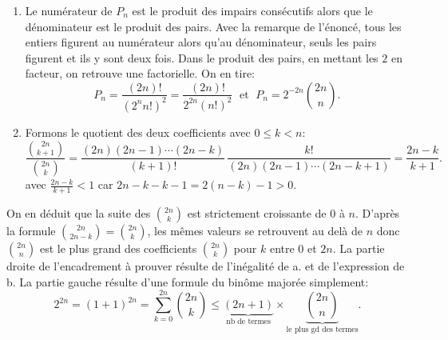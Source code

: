 \begin{enumerate}
\begin{enumerate}
  \item Le numérateur de $P_n$ est le produit des impairs consécutifs alors que le dénominateur est le produit des pairs. Avec la remarque de l'énoncé, tous les entiers figurent au numérateur alors qu'au dénominateur, seuls les pairs figurent et ils y sont deux fois. Dans le produit des pairs, en mettant les $2$ en facteur, on retrouve une factorielle. On en tire:
\begin{displaymath}
  P_n = \frac{(2n)!}{(2^n n!)^2} = \frac{(2n)!}{2^{2n}(n!)^2} \;\text{ et }\;
  P_n = 2^{-2n} \binom{2n}{n}.
\end{displaymath}

  \item Formons le quotient des deux coefficients avec $0 \leq k < n$:
\begin{displaymath}
  \frac{\binom{2n}{k+1}}{\binom{2n}{k}}
= \frac{(2n)(2n-1)\cdots (2n-k)}{(k+1)!}\, \frac{k!}{(2n)(2n-1)\cdots (2n-k+1)}
= \frac{2n-k}{k+1}.
\end{displaymath}
avec $\frac{2n-k}{k+1}<1$ car $2n-k-k-1=2(n-k)-1>0$.
\end{enumerate}
On en déduit que la suite des $\binom{2n}{k}$ est strictement croissante de $0$ à $n$. D'après la formule $\binom{2n}{2n-k} = \binom{2n}{k}$, les mêmes valeurs se retrouvent au delà de $n$ donc $\binom{2n}{n}$ est le plus grand des coefficients $\binom{2n}{k}$ pour $k$ entre $0$ et $2n$.\newline
La partie droite de l'encadrement à prouver résulte de l'inégalité de a. et de l'expression de b.\newline
La partie gauche résulte d'une formule du binôme majorée simplement:
\begin{displaymath}
  2^{2n} = (1+1)^{2n} = \sum_{k=0}^{2n} \binom{2n}{k} \leq 
\underset{\text{nb de termes}}{\underbrace{(2n+1)}}\times
\underset{\text{le plus gd des termes}}{\underbrace{\binom{2n}{n}}}.
\end{displaymath}

\end{enumerate}
